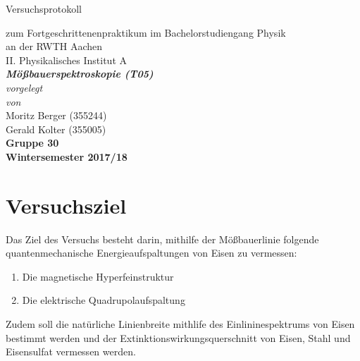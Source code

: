 \documentclass[12pt,a4paper]{article}
\author{Gerald}
\begin{document}
	\setlength{\parindent}{0pt} 
	\begin{center}
		{\LARGE Versuchsprotokoll}\\
		\begin{large}
			zum Fortgeschrittenenpraktikum im Bachelorstudiengang Physik\\[0.4cm]
			an der RWTH Aachen\\
			II. Physikalisches Institut A\\[5.5cm]
			\Large\textbf{\textsl{Mößbauerspektroskopie (T05)}}\\[5.5cm]
			\normalsize\textit{vorgelegt\\von}\\[0.4cm]
			\large{Moritz Berger (355244)\\Gerald Kolter (355005)}\\\textbf{Gruppe 30}\\[2cm]
			\large \textbf{Wintersemester 2017/18}
		\end{large}
	\end{center}
	\newpage
	
	\tableofcontents
	\newpage

\section{Versuchsziel}
Das Ziel des Versuchs besteht darin, mithilfe der Mößbauerlinie folgende quantenmechanische Energieaufspaltungen von Eisen zu vermessen:
\begin{enumerate}
\item Die magnetische Hyperfeinstruktur
\item Die elektrische Quadrupolaufspaltung
\end{enumerate}
Zudem soll die natürliche Linienbreite mithlife des Einlininespektrums von Eisen bestimmt werden und der Extinktionswirkungsquerschnitt von Eisen, Stahl und Eisensulfat vermessen werden.
\end{document}
